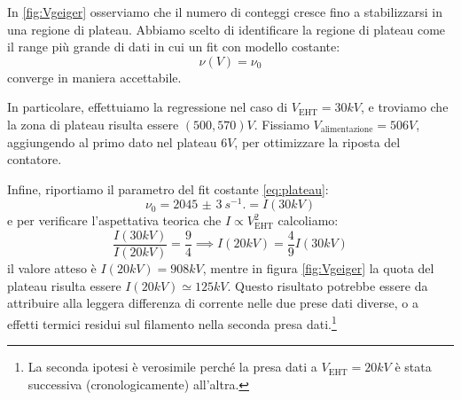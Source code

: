 In \cref{fig:Vgeiger} osserviamo che il numero di conteggi cresce fino a stabilizzarsi in una regione di plateau.
Abbiamo scelto di identificare la regione di plateau come il range più grande di dati in cui un fit con modello costante:
\begin{equation} \label{eq:plateau}
\nu(V) = \nu_0
\end{equation}
converge in maniera accettabile.

In particolare, effettuiamo la regressione nel caso di $V_\text{EHT} = 30 \unit{kV}$, e troviamo che la zona di plateau risulta essere $ (500,570) \unit{V} $. 
Fissiamo $V_\text{alimentazione} = 506 \unit{V}$, aggiungendo al primo dato nel plateau $ 6 \unit{V} $, per ottimizzare la riposta del contatore. 

Infine, riportiamo il parametro del fit costante \cref{eq:plateau}:
\begin{equation}
\nu_{0} = \SI{2045(3)}{s^{-1}}. = I(30\unit{kV})
\end{equation}
e per verificare l'aspettativa teorica che $ I \propto V_\text{EHT}^2 $ calcoliamo:
\begin{equation}
\frac{I(30\unit{kV})}{I(20\unit{kV})} = \frac{9}{4} \implies I(20\unit{kV}) = \frac{4}{9} I(30\unit{kV})\end{equation}
il valore atteso è $ I(20\unit{kV})= 908 \unit{kV}$, mentre in figura \cref{fig:Vgeiger} la quota del plateau risulta essere $ I(20\unit{kV})\simeq  125\unit{kV}$. Questo risultato potrebbe essere da attribuire alla leggera differenza di corrente nelle due prese dati diverse, o a effetti termici residui sul filamento nella seconda presa dati.\footnote{La seconda ipotesi è verosimile perché la presa dati a $ V_\text{EHT} = 20 \unit{kV} $ è stata successiva (cronologicamente) all'altra.} 

